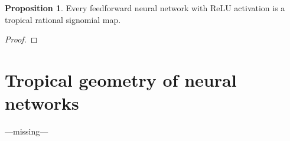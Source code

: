 \documentclass{article}
\theoremstyle{definition}
\newtheorem{proposition}[theorem]{Proposition}
\begin{document}
\begin{proposition}\cite{zhang2018tropical}
Every feedforward neural network with ReLU activation is a tropical rational signomial map.
\end{proposition}
\begin{proof}

\end{proof}
\newpage

\section{Tropical geometry of neural networks}
\label{sec:tropical_geometry_of_neural_networks}

---missing---

\newpage

%
%
%
%
%
%
%
%
%
%
%


%

%
%



\end{document}
